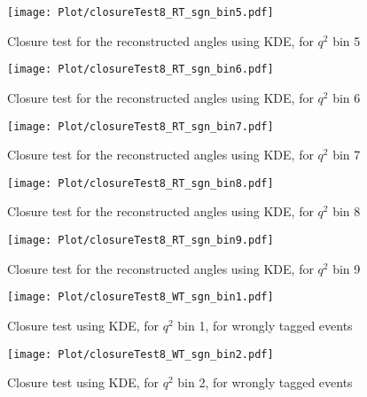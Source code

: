 \begin{figure}[hbt]
    \texttt{[image: Plot/closureTest8\_RT\_sgn\_bin5.pdf]}

    \caption{Closure test for the reconstructed angles using KDE, for $q^2$ bin 5}
    \label{fig:clKDE5}
\end{figure}

\begin{figure}[hbt]
    \texttt{[image: Plot/closureTest8\_RT\_sgn\_bin6.pdf]}

    \caption{Closure test for the reconstructed angles using KDE, for $q^2$ bin 6}
    \label{fig:clKDE6}
\end{figure}

\begin{figure}[hbt]
    \texttt{[image: Plot/closureTest8\_RT\_sgn\_bin7.pdf]}

    \caption{Closure test for the reconstructed angles using KDE, for $q^2$ bin 7}
    \label{fig:clKDE7}
\end{figure}

\begin{figure}[hbt]
    \texttt{[image: Plot/closureTest8\_RT\_sgn\_bin8.pdf]}

    \caption{Closure test for the reconstructed angles using KDE, for $q^2$ bin 8}
    \label{fig:clKDE8}
\end{figure}

\begin{figure}[hbt]
    \texttt{[image: Plot/closureTest8\_RT\_sgn\_bin9.pdf]}

    \caption{Closure test for the reconstructed angles using KDE, for $q^2$ bin 9}
    \label{fig:clKDE9}
\end{figure}

\clearpage

\begin{figure}[hbt]
    \texttt{[image: Plot/closureTest8\_WT\_sgn\_bin1.pdf]}

    \caption{Closure test using KDE, for $q^2$ bin 1, for wrongly tagged events}
    \label{fig:clKDE1wt}
\end{figure}

\begin{figure}[hbt]
    \texttt{[image: Plot/closureTest8\_WT\_sgn\_bin2.pdf]}

    \caption{Closure test using KDE, for $q^2$ bin 2, for wrongly tagged events}
    \label{fig:clKDE2wt}
\end{figure}

